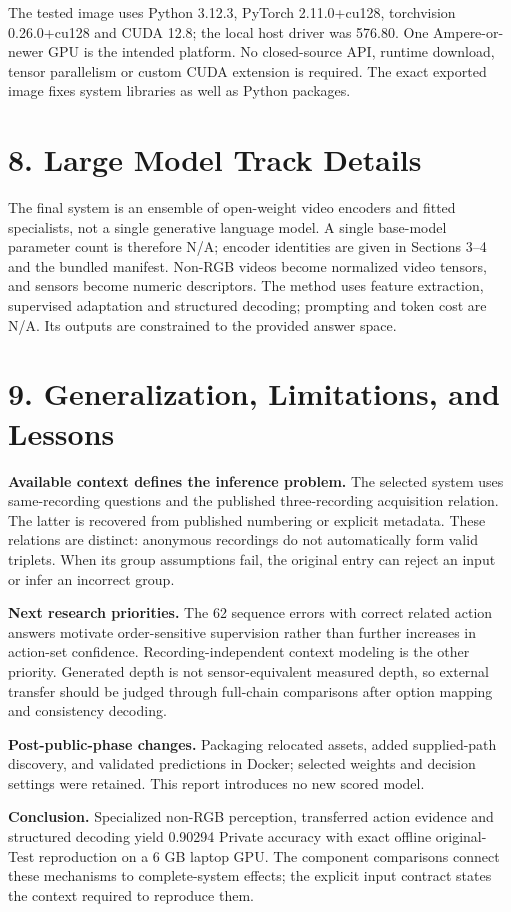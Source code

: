 \documentclass[12pt,a4paper]{article}
\newcommand{\pageheading}[1]{\vspace*{-5pt}\section*{#1}}
\begin{document}
The tested image uses Python 3.12.3, PyTorch 2.11.0+cu128, torchvision 0.26.0+cu128 and CUDA 12.8; the local host driver was 576.80. One Ampere-or-newer GPU is the intended platform. No closed-source API, runtime download, tensor parallelism or custom CUDA extension is required. The exact exported image fixes system libraries as well as Python packages.

\section*{8. Large Model Track Details}
The final system is an ensemble of open-weight video encoders and fitted specialists, not a single generative language model. A single base-model parameter count is therefore N/A; encoder identities are given in Sections 3--4 and the bundled manifest. Non-RGB videos become normalized video tensors, and sensors become numeric descriptors. The method uses feature extraction, supervised adaptation and structured decoding; prompting and token cost are N/A. Its outputs are constrained to the provided answer space.

\pageheading{9. Generalization, Limitations, and Lessons}
\textbf{Available context defines the inference problem.} The selected system uses same-recording questions and the published three-recording acquisition relation. The latter is recovered from published numbering or explicit metadata. These relations are distinct: anonymous recordings do not automatically form valid triplets. When its group assumptions fail, the original entry can reject an input or infer an incorrect group.

\textbf{Next research priorities.} The 62 sequence errors with correct related action answers motivate order-sensitive supervision rather than further increases in action-set confidence. Recording-independent context modeling is the other priority. Generated depth is not sensor-equivalent measured depth, so external transfer should be judged through full-chain comparisons after option mapping and consistency decoding.

\textbf{Post-public-phase changes.} Packaging relocated assets, added supplied-path discovery, and validated predictions in Docker; selected weights and decision settings were retained. This report introduces no new scored model.

\textbf{Conclusion.} Specialized non-RGB perception, transferred action evidence and structured decoding yield 0.90294 Private accuracy with exact offline original-Test reproduction on a 6 GB laptop GPU. The component comparisons connect these mechanisms to complete-system effects; the explicit input contract states the context required to reproduce them.
\end{document}
